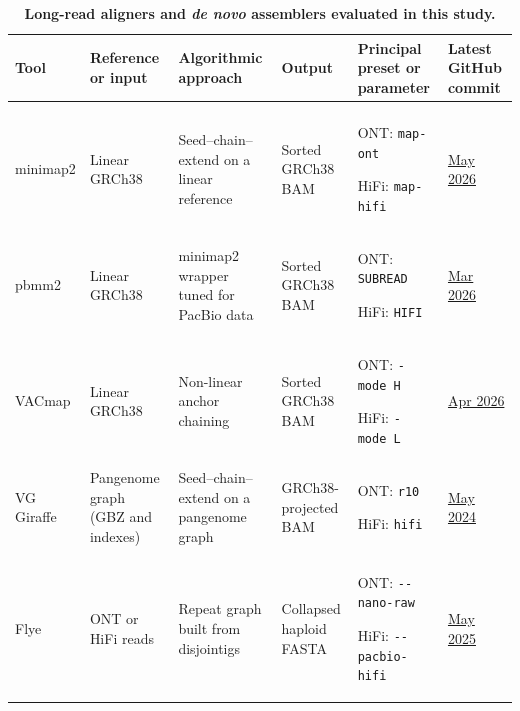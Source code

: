 \documentclass[12pt, letterpaper]{article}
\begin{document}
\begin{table}[!tbp]
\centering
\footnotesize
\caption{\textbf{Long-read aligners and \textit{de novo} assemblers evaluated in this study.}}
\label{tab:tool_overview}
\setlength{\tabcolsep}{2.5pt}
\begin{tabular}{>{\raggedright\arraybackslash}p{1.65cm}>{\raggedright\arraybackslash}p{2.15cm}>{\raggedright\arraybackslash}p{2.85cm}>{\raggedright\arraybackslash}p{3.10cm}>{\raggedright\arraybackslash}p{3.25cm}>{\raggedright\arraybackslash}p{1.65cm}}
\toprule
\textbf{Tool} & \textbf{Reference or input} & \textbf{Algorithmic approach} & \textbf{Output} & \textbf{Principal preset or parameter} & \textbf{Latest GitHub commit} \\
\midrule
\multicolumn{6}{l}{\textbf{Read aligners}} \\
\addlinespace[1pt]
minimap2 & Linear GRCh38 & Seed--chain--extend on a linear reference & Sorted GRCh38 BAM & ONT: \texttt{map-ont}\par\vspace{2pt}HiFi: \texttt{map-hifi} & \href{https://github.com/lh3/minimap2}{May 2026} \\
\addlinespace[6pt]
pbmm2 & Linear GRCh38 & minimap2 wrapper tuned for PacBio data & Sorted GRCh38 BAM & ONT: \texttt{SUBREAD}\par\vspace{2pt}HiFi: \texttt{HIFI} & \href{https://github.com/PacificBiosciences/pbmm2}{Mar 2026} \\
\addlinespace[6pt]
VACmap & Linear GRCh38 & Non-linear anchor chaining & Sorted GRCh38 BAM & ONT: \texttt{-mode~H}\par\vspace{2pt}HiFi: \texttt{-mode~L} & \href{https://github.com/micahvista/VACmap}{Apr 2026} \\
\addlinespace[6pt]
VG Giraffe & Pangenome graph (GBZ and indexes) & Seed--chain--extend on a pangenome graph & GRCh38-projected BAM & ONT: \texttt{r10}\par\vspace{2pt}HiFi: \texttt{hifi} & \href{https://github.com/vgteam/vg}{May 2024} \\
\midrule
\multicolumn{6}{l}{\textbf{\textit{De novo} assemblers}} \\
\addlinespace[1pt]
Flye & ONT or HiFi reads & Repeat graph built from disjointigs & Collapsed haploid FASTA & ONT: \texttt{-{}-nano-raw}\par\vspace{2pt}HiFi: \texttt{-{}-pacbio-hifi} & \href{https://github.com/mikolmogorov/Flye}{May 2025} \\

\end{tabular}
\end{table}
\end{document}
